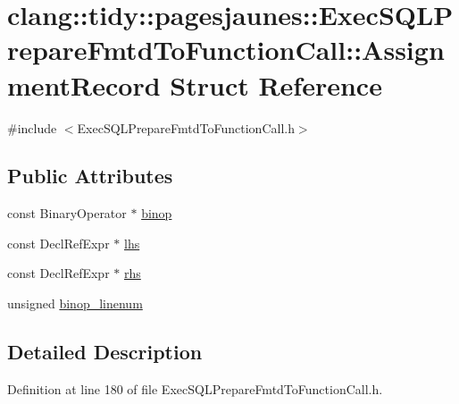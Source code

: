 \hypertarget{structclang_1_1tidy_1_1pagesjaunes_1_1_exec_s_q_l_prepare_fmtd_to_function_call_1_1_assignment_record}{}\section{clang\+:\+:tidy\+:\+:pagesjaunes\+:\+:Exec\+S\+Q\+L\+Prepare\+Fmtd\+To\+Function\+Call\+:\+:Assignment\+Record Struct Reference}
\label{structclang_1_1tidy_1_1pagesjaunes_1_1_exec_s_q_l_prepare_fmtd_to_function_call_1_1_assignment_record}


{\ttfamily \#include $<$Exec\+S\+Q\+L\+Prepare\+Fmtd\+To\+Function\+Call.\+h$>$}

\subsection*{Public Attributes}
\begin{DoxyCompactItemize}
\item 
const Binary\+Operator $\ast$ \hyperlink{structclang_1_1tidy_1_1pagesjaunes_1_1_exec_s_q_l_prepare_fmtd_to_function_call_1_1_assignment_record_accb7309e2c1b162fda2e2c5bfa330b48}{binop}
\item 
const Decl\+Ref\+Expr $\ast$ \hyperlink{structclang_1_1tidy_1_1pagesjaunes_1_1_exec_s_q_l_prepare_fmtd_to_function_call_1_1_assignment_record_a3295b4dd864d78a930e7c2f95ffbb367}{lhs}
\item 
const Decl\+Ref\+Expr $\ast$ \hyperlink{structclang_1_1tidy_1_1pagesjaunes_1_1_exec_s_q_l_prepare_fmtd_to_function_call_1_1_assignment_record_a7cad51276037aeb188704179f906f01c}{rhs}
\item 
unsigned \hyperlink{structclang_1_1tidy_1_1pagesjaunes_1_1_exec_s_q_l_prepare_fmtd_to_function_call_1_1_assignment_record_aa357676e6f5bb3e6ae216437c7360b16}{binop\+\_\+linenum}
\end{DoxyCompactItemize}


\subsection{Detailed Description}


Definition at line 180 of file Exec\+S\+Q\+L\+Prepare\+Fmtd\+To\+Function\+Call.\+h.




